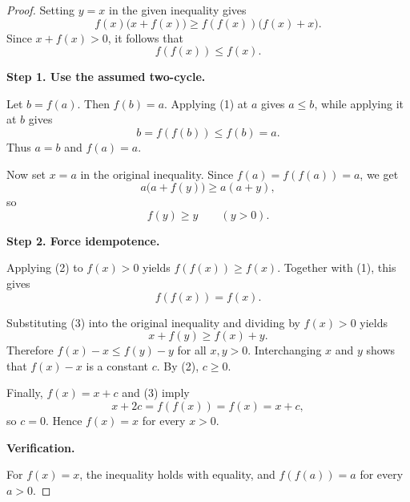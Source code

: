 
\begin{dlsummary}[title={\bfseries Solution 13. The Fixed-Point Lever},breakable]

\begin{proof}
Setting $y=x$ in the given inequality gives
\[
f(x)\bigl(x+f(x)\bigr)
\geq f(f(x))\bigl(f(x)+x\bigr).
\]
Since $x+f(x)>0$, it follows that
\[
f(f(x))\leq f(x). \tag{1}
\]

\medskip
\noindent
\textbf{Step 1. Use the assumed two-cycle.}

Let $b=f(a)$. Then $f(b)=a$. Applying (1) at $a$ gives
$a\leq b$, while applying it at $b$ gives
\[
b=f(f(b))\leq f(b)=a.
\]
Thus $a=b$ and $f(a)=a$.

Now set $x=a$ in the original inequality. Since
$f(a)=f(f(a))=a$, we get
\[
a\bigl(a+f(y)\bigr)\geq a(a+y),
\]
so
\[
f(y)\geq y\qquad(y>0). \tag{2}
\]

\medskip
\noindent
\textbf{Step 2. Force idempotence.}

Applying (2) to $f(x)>0$ yields $f(f(x))\geq f(x)$.
Together with (1), this gives
\[
f(f(x))=f(x). \tag{3}
\]

Substituting (3) into the original inequality and dividing by
$f(x)>0$ yields
\[
x+f(y)\geq f(x)+y.
\]
Therefore $f(x)-x\leq f(y)-y$ for all $x,y>0$.
Interchanging $x$ and $y$ shows that $f(x)-x$ is a constant
$c$. By (2), $c\geq0$.

Finally, $f(x)=x+c$ and (3) imply
\[
x+2c=f(f(x))=f(x)=x+c,
\]
so $c=0$. Hence $f(x)=x$ for every $x>0$.

\medskip
\noindent
\textbf{Verification.}

For $f(x)=x$, the inequality holds with equality, and
$f(f(a))=a$ for every $a>0$.
\end{proof}

\end{dlsummary}